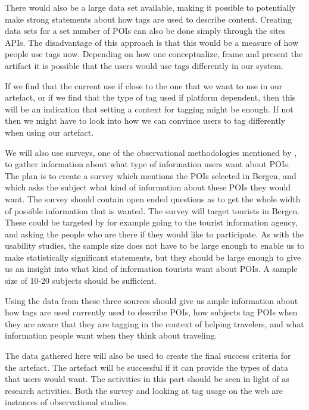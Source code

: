 There would also be a large data set available, making it possible to potentially make strong statements about how tags are used to describe content.
Creating data sets for a set number of POIs can also be done simply through the sites APIs.
The disadvantage of this approach is that this would be a measure of how people use tags now. 
Depending on how one conceptualize, frame and present the artifact it is possible that the users would use tags differently in our system.

If we find that the current use if close to the one that we want to use in our artefact, 
or if we find that the type of tag used if platform dependent, 
then this will be an indication that setting a context for tagging might be enough.
If not then we might have to look into how we can convince users to tag differently when using our artefact.


We will also use surveys, one of the observational methodologies mentioned by \citet{Chen1990}, to gather information about what type of information users want about POIs.
The plan is to create a survey which mentions the POIs selected in Bergen, and which asks the subject what kind of information about these POIs they would want. 
The survey should contain open ended questions as to get the whole width of possible information that is wanted.
The survey will target tourists in Bergen. 
These could be targeted by for example going to the tourist information agency, and asking the people who are there if they would like to participate.
As with the usability studies, the sample size does not have to be large enough to enable us to make statistically significant statements,
but they should be large enough to give us an insight into what kind of information tourists want about POIs. 
A sample size of 10-20 subjects should be sufficient.
 
Using the data from these three sources should give us ample information about how tags are used currently used to describe POIs, 
how subjects tag POIs when they are aware that they are tagging in the context of helping travelers, 
and what information people want when they think about traveling. 

The data gathered here will also be used to create the final success criteria for the artefact. 
The artefact will be successful if it can provide the types of data that users would want. 
The activities in this part should be seen in light of \citet{Chen1990} as research activities. 
Both the survey and looking at tag usage on the web are instances of observational studies.

